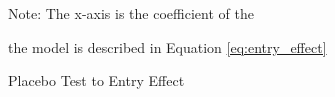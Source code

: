 \documentclass[11pt]{article}
\begin{document}
\begin{figure}[H]
  \caption{Placebo Test to Entry Effect}
  \label{fig:placebo_test_entry}

  Note: The x-axis is the coefficient of the 

  the model is described in Equation \eqref{eq:entry_effect}
  \end{figure}
\end{document}
